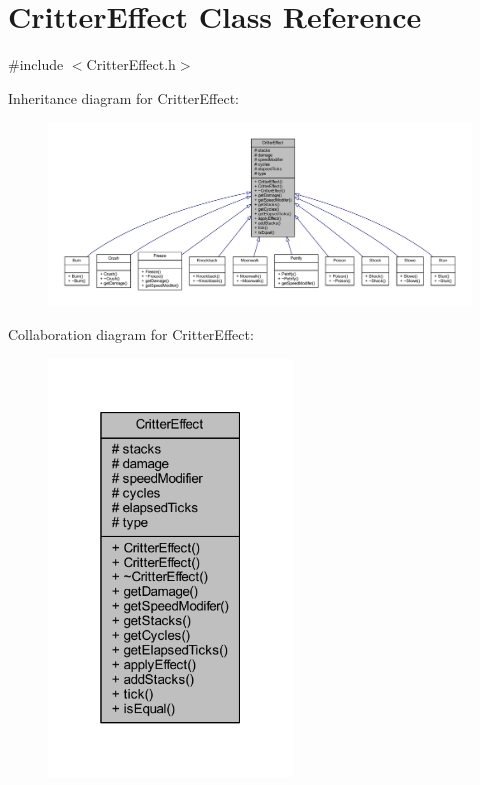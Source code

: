 \hypertarget{class_critter_effect}{\section{Critter\+Effect Class Reference}
\label{class_critter_effect}
}


{\ttfamily \#include $<$Critter\+Effect.\+h$>$}



Inheritance diagram for Critter\+Effect\+:\nopagebreak
\begin{figure}[H]
\begin{center}
\leavevmode
\includegraphics[width=350pt]{class_critter_effect__inherit__graph}
\end{center}
\end{figure}


Collaboration diagram for Critter\+Effect\+:\nopagebreak
\begin{figure}[H]
\begin{center}
\leavevmode
\includegraphics[width=184pt]{class_critter_effect__coll__graph}
\end{center}
\end{figure}
